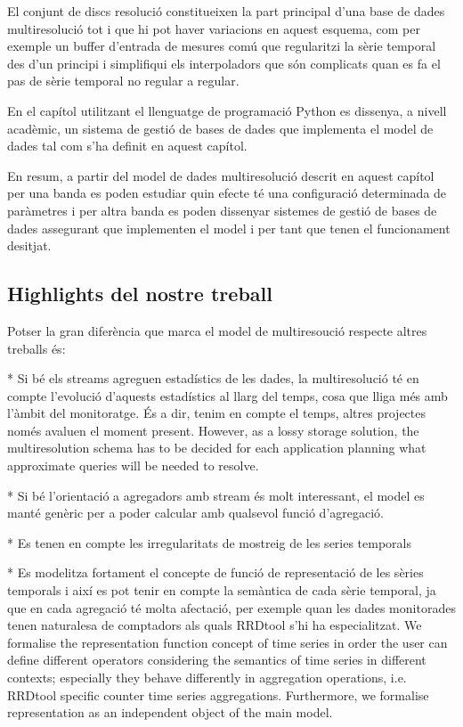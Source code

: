 El conjunt de discs resolució constitueixen la part principal d'una base de dades multiresolució tot i que hi pot haver variacions en aquest esquema, com per exemple un buffer d'entrada de mesures comú que regularitzi la sèrie temporal des d'un principi i simplifiqui els interpoladors que són complicats quan es fa el pas de sèrie temporal no regular a regular.


En el capítol 
 utilitzant el llenguatge de programació Python es dissenya, a nivell acadèmic, un sistema de gestió de bases de dades que implementa el model de dades tal com s'ha definit en aquest capítol.


En resum, a partir del model de dades multiresolució descrit en aquest capítol per una banda es poden estudiar quin efecte té una configuració determinada de paràmetres i per altra banda es poden dissenyar sistemes de gestió de bases de dades assegurant que implementen el model i per tant que tenen el funcionament desitjat.






\subsection{Highlights del nostre treball}

Potser la gran diferència que marca el model de multiresoució respecte altres treballs és:

* Si bé els streams agreguen estadístics de les dades, la multiresolució té en compte l'evolució d'aquests estadístics al llarg del temps, cosa que lliga més amb l'àmbit del monitoratge. És a dir, tenim en compte el temps, altres projectes només avaluen el moment present.  However, as a lossy storage solution, the
  multiresolution schema has to be decided for each application
  planning what approximate queries will be needed to resolve.

* Si bé l'orientació a agregadors amb stream és molt interessant, el model es manté genèric per a poder calcular amb qualsevol funció d'agregació.

* Es tenen en compte les irregularitats de mostreig de les series temporals

* Es modelitza fortament el concepte de funció de representació de les sèries temporals i així es pot tenir en compte la semàntica de cada sèrie temporal, ja que en cada agregació té molta afectació, per exemple quan les dades monitorades tenen naturalesa de comptadors als quals RRDtool s'hi ha especialitzat.
 We formalise the representation function concept of time series
  in order the user can define different operators considering the
  semantics of time series in different contexts; especially they
  behave differently in aggregation operations, i.e. RRDtool specific counter
  time series aggregations. Furthermore, we formalise representation
  as an independent object of the main model.

